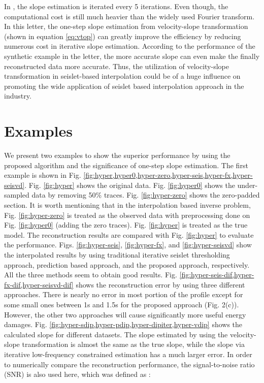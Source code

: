 In \cite{shuwei20153}, the slope estimation is iterated every 5 iterations. Even though, the computational cost is still much heavier than the widely used Fourier transform. In this letter, the one-step slope estimation from velocity-slope transformation (shown in equation \ref{eq:vtop}) can greatly improve the efficiency by reducing numerous cost in iterative slope estimation. According to the performance of the synthetic example in the letter, the more accurate slope can even make the finally reconstructed data more accurate.  Thus, the utilization of velocity-slope transformation in seislet-based interpolation could be of a huge influence on promoting the wide application of seislet based interpolation approach in the industry. 

\section{Examples}
We present two examples to show the superior performance  by using the proposed algorithm and the significance of one-step slope estimation.  The first example is shown in Fig. \ref{fig:hyper,hyper0,hyper-zero,hyper-seis,hyper-fx,hyper-seisvd}. Fig. \ref{fig:hyper} shows the original data. Fig. \ref{fig:hyper0} shows the under-sampled data by removing 50\% traces. Fig. \ref{fig:hyper-zero} shows the zero-padded section. It is worth mentioning that in the interpolation based inverse problem, Fig. \ref{fig:hyper-zero} is treated as the observed data with preprocessing done on Fig. \ref{fig:hyper0} (adding the zero traces). Fig. \ref{fig:hyper} is treated as the true model. The reconstruction results are compared with Fig. \ref{fig:hyper} to evaluate the performance.  Figs. \ref{fig:hyper-seis}, \ref{fig:hyper-fx}, and \ref{fig:hyper-seisvd} show the interpolated results by using traditional iterative seislet thresholding approach, prediction based approach, and the proposed approach, respectively. All the three methods seem to obtain good results.   Fig. \ref{fig:hyper-seis-dif,hyper-fx-dif,hyper-seisvd-dif} shows the reconstruction error by using three different approaches. There is nearly no error in most portion of the profile except for some small ones between 1s and 1.5s for the proposed approach (Fig. 2(c)). However, the other two approaches will cause significantly more useful energy damages. Fig. \ref{fig:hyper-sdip,hyper-pdip,hyper-dipiter,hyper-vdip} shows the calculated slope for different datasets. The slope estimated by using the velocity-slope transformation is almost the same as the true slope, while the slope via iterative low-frequency constrained estimation has a much larger error.  In order to numerically compare the reconstruction performance, the signal-to-noise ratio (SNR) is also used here, which was defined as \cite{herrmann,yangkang2015ortho}:
